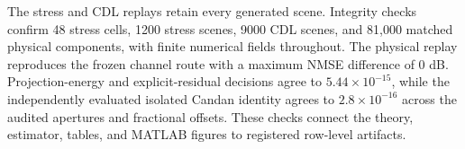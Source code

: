 \documentclass[11pt,onecolumn]{IEEEtran}
\begin{document}
The stress and CDL replays retain every generated scene. Integrity checks
confirm 48 stress cells, 1200 stress scenes, 9000 CDL scenes, and 81,000
matched physical components, with finite numerical fields throughout. The
physical replay reproduces the frozen channel route with a maximum NMSE
difference of 0 dB. Projection-energy and explicit-residual decisions agree
to $5.44\times10^{-15}$, while the independently evaluated isolated Candan
identity agrees to $2.8\times10^{-16}$ across the audited apertures and
fractional offsets. These checks connect the theory, estimator, tables, and
MATLAB figures to registered row-level artifacts.
\end{document}
